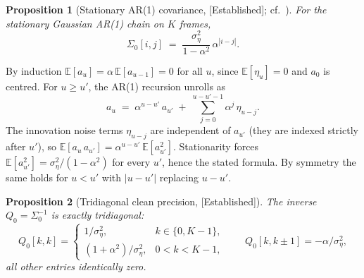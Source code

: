 \documentclass[11pt]{article}
\newtheorem{proposition}{Proposition}
\theoremstyle{definition}
\newcommand{\E}{\mathbb{E}}
\newcommand{\Sig}{\Sigma}
\newcommand{\Established}{\textcolor{black!50!green}{\textsf{[Established]}}}
\begin{document}
\begin{proposition}[Stationary AR(1) covariance, \Established;
cf.\ \cite{BrockwellDavis1991}]\label{prop:stat-cov}
For the stationary Gaussian AR(1) chain on \(K\) frames,
\begin{equation}\label{eq:stat-covariance}
    \Sig_0[i, j] \;=\; \frac{\sigma_\eta^2}{1 - \alpha^2}\,
                        \alpha^{|i - j|}.
\end{equation}
\end{proposition}

\begin{derivation}
By induction \(\E[a_u] = \alpha\, \E[a_{u - 1}] = 0\) for all \(u\),
since \(\E[\eta_u] = 0\) and \(a_0\) is centred. For \(u \geq u'\),
the AR(1) recursion unrolls as
\begin{equation}
    a_u \;=\; \alpha^{u - u'}\, a_{u'} \;+\; \sum_{j = 0}^{u - u' - 1}
              \alpha^j\, \eta_{u - j}.
\end{equation}
The innovation noise terms \(\eta_{u - j}\) are independent of
\(a_{u'}\) (they are indexed strictly after \(u'\)), so
\(\E[a_u\, a_{u'}] = \alpha^{u - u'}\, \E[a_{u'}^2]\). Stationarity
forces \(\E[a_{u'}^2] = \sigma_\eta^2 / (1 - \alpha^2)\) for every
\(u'\), hence the stated formula. By symmetry the same holds for
\(u < u'\) with \(|u - u'|\) replacing \(u - u'\).
\end{derivation}

\begin{proposition}[Tridiagonal clean precision, \Established]
\label{prop:Q0-tridiag}
The inverse \(Q_0 = \Sig_0^{-1}\) is exactly tridiagonal:
\begin{equation}\label{eq:Q0}
    Q_0[k, k] = \begin{cases}
        1 / \sigma_\eta^2, & k \in \{0, K - 1\}, \\
        (1 + \alpha^2) / \sigma_\eta^2, & 0 < k < K - 1,
    \end{cases}
    \qquad
    Q_0[k, k \pm 1] = -\alpha / \sigma_\eta^2,
\end{equation}
all other entries identically zero.
\end{proposition}
\end{document}

